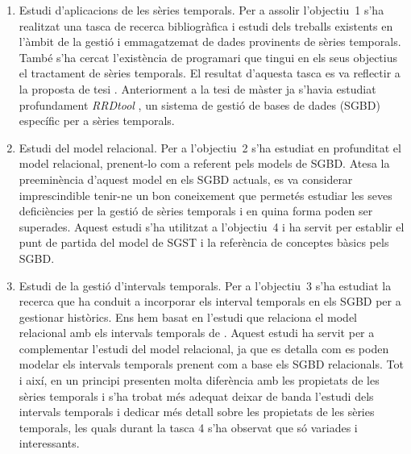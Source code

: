 \begin{enumerate}

\item Estudi d'aplicacions de les sèries temporals. Per a assolir
  l'objectiu~1 s'ha realitzat una tasca de recerca bibliogràfica i
  estudi dels treballs existents en l'àmbit de la gestió i
  emmagatzemat de dades provinents de sèries temporals. També s'ha
  cercat l'existència de programari que tingui en els seus objectius
  el tractament de sèries temporals. El resultat d'aquesta tasca es va
  reflectir a la proposta de
  tesi \parencite{llusa12:ptd}. Anteriorment a la tesi de
  màster \parencite{llusa11:tfm} ja s'havia estudiat profundament
  \emph{RRDtool} \parencite{rrdtool}, un sistema de gestió de bases de
  dades (SGBD) específic per a sèries temporals.


\item Estudi del model relacional. Per a l'objectiu~2 s'ha estudiat en
  profunditat el model relacional, prenent-lo com a referent pels
  models de SGBD. Atesa la preeminència d'aquest model en els SGBD
  actuals, es va considerar imprescindible tenir-ne un bon coneixement
  que permetés estudiar les seves deficiències per la gestió de sèries
  temporals i en quina forma poden ser superades. Aquest estudi s'ha
  utilitzat a l'objectiu~4 i ha servit per establir el punt de partida
  del model de SGST i la referència de conceptes bàsics pels SGBD.


\item Estudi de la gestió d'intervals temporals. Per a l'objectiu~3
  s'ha estudiat la recerca que ha conduit a incorporar els interval
  temporals en els SGBD per a gestionar històrics. Ens hem basat en
  l'estudi que relaciona el model relacional amb els intervals
  temporals de \textcite{date02:_tempor_data_relat_model}.  Aquest
  estudi ha servit per a complementar l'estudi del model relacional,
  ja que es detalla com es poden modelar els intervals temporals
  prenent com a base els SGBD relacionals. Tot i així, en un principi
  presenten molta diferència amb les propietats de les sèries
  temporals i s'ha trobat més adequat deixar de banda l'estudi dels
  intervals temporals i dedicar més detall sobre les propietats de les
  sèries temporals, les quals durant la tasca 4 s'ha observat que só
  variades i interessants.




\end{enumerate}
